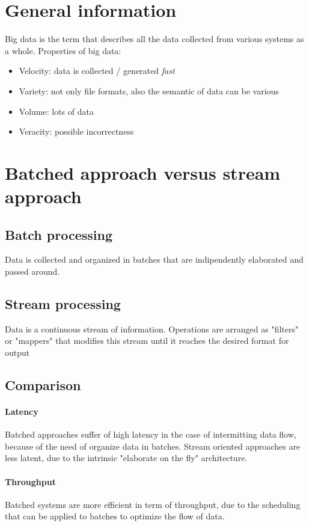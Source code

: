 \documentclass[10pt,a4paper]{article}
\begin{document}
		\section{General information}
			Big data is the term that describes all the data collected from various systems as a whole. Properties of big data:
			\begin{itemize}
				\item Velocity: data is collected / generated \emph{fast}
				\item Variety: not only file formats, also the semantic of data can be various
				\item Volume: lots of data
				\item Veracity: possible incorrectness
			\end{itemize}
		
		\section{Batched approach versus stream approach}
			\subsection{Batch processing}
				Data is collected and organized in batches that are indipendently elaborated and passed around. 
			\subsection{Stream processing}
				Data is a continuous stream of information. Operations are arranged as "filters" or "mappers" that modifies this stream until it reaches the desired format for output
			\subsection{Comparison}
				\paragraph{Latency}
					Batched approaches suffer of high latency in the case of intermitting data flow, because of the need of organize data in batches. Stream oriented approaches are less latent, due to the intrinsic "elaborate on the fly" architecture.
				\paragraph{Throughput}
					Batched systems are more efficient in term of throughput, due to the scheduling that can be applied to batches to optimize the flow of data.
\end{document}
